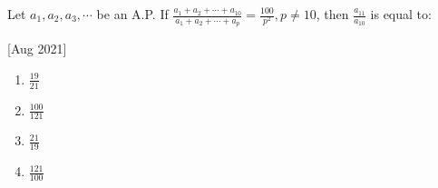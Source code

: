     \item Let $a_1,a_2,a_3,\cdots$ be an A.P. If $\frac{a_1+a_2+\cdots+a_{10}}{a_1+a_2+\cdots+a_p}=\frac{100}{p^2},p\neq10$, then $\frac{a_{11}}{a_{10}}$ is equal to:
    
    \hfill[Aug 2021]
    
        \begin{multicols}{4}
            \begin{enumerate}
                \item $\frac{19}{21}$
                \item $\frac{100}{121}$
                \item $\frac{21}{19}$
                \item $\frac{121}{100}$
            \end{enumerate}
        \end{multicols}
